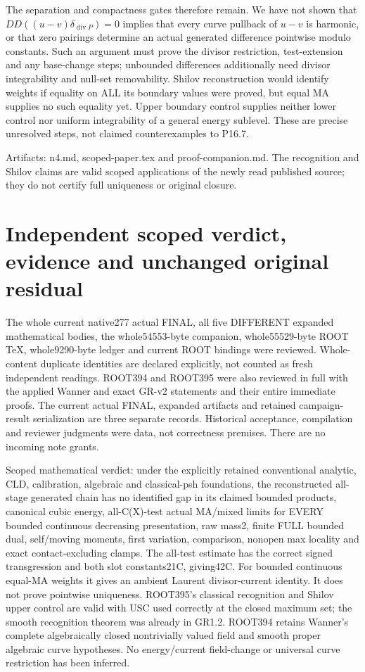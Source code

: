 \documentclass[11pt]{article}
\begin{document}
The separation and compactness gates therefore remain. We have not shown that $DD((u-v)\delta_{\operatorname{div}P})=0$ implies that every curve pullback of $u-v$ is harmonic, or that zero pairings determine an actual generated difference pointwise modulo constants. Such an argument must prove the divisor restriction, test-extension and any base-change steps; unbounded differences additionally need divisor integrability and null-set removability. Shilov reconstruction would identify weights if equality on ALL its boundary values were proved, but equal MA supplies no such equality yet. Upper boundary control supplies neither lower control nor uniform integrability of a general energy sublevel. These are precise unresolved steps, not claimed counterexamples to P16.7.

Artifacts: n4.md, scoped-paper.tex and proof-companion.md. The recognition and Shilov claims are valid scoped applications of the newly read published source; they do not certify full uniqueness or original closure.

\section*{Independent scoped verdict, evidence and unchanged original residual}

The whole current native277 actual FINAL, all five DIFFERENT expanded mathematical bodies, the whole54553-byte companion, whole55529-byte ROOT TeX, whole9290-byte ledger and current ROOT bindings were reviewed. Whole-content duplicate identities are declared explicitly, not counted as fresh independent readings. ROOT394 and ROOT395 were also reviewed in full with the applied Wanner and exact GR-v2 statements and their entire immediate proofs. The current actual FINAL, expanded artifacts and retained campaign-result serialization are three separate records. Historical acceptance, compilation and reviewer judgments were data, not correctness premises. There are no incoming note grants.

Scoped mathematical verdict: under the explicitly retained conventional analytic, CLD, calibration, algebraic and classical-psh foundations, the reconstructed all-stage generated chain has no identified gap in its claimed bounded products, canonical cubic energy, all-C(X)-test actual MA/mixed limits for EVERY bounded continuous decreasing presentation, raw mass2, finite FULL bounded dual, self/moving moments, first variation, comparison, nonopen max locality and exact contact-excluding clamps. The all-test estimate has the correct signed transgression and both slot constants21C, giving42C. For bounded continuous equal-MA weights it gives an ambient Laurent divisor-current identity. It does not prove pointwise uniqueness. ROOT395's classical recognition and Shilov upper control are valid with USC used correctly at the closed maximum set; the smooth recognition theorem was already in GR1.2. ROOT394 retains Wanner's complete algebraically closed nontrivially valued field and smooth proper algebraic curve hypotheses. No energy/current field-change or universal curve restriction has been inferred.
\end{document}
